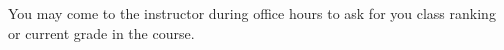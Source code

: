 \documentclass[11pt]{article}
\begin{document}
You may come to the instructor during office hours to ask for you class ranking or current grade in the course. 
%
%
%
%
%
%
%
\end{document}
